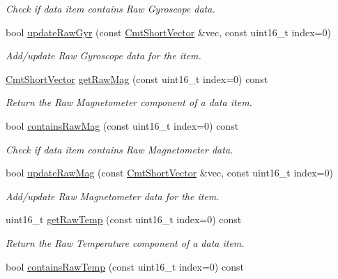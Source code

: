 \begin{DoxyCompactItemize}
\begin{DoxyCompactList}\small\item\em \-Check if data item contains \-Raw \-Gyroscope data. \end{DoxyCompactList}\item 
\hypertarget{classxsens_1_1Packet_a411bdaa5e21af191e53aeac808345b46}{bool \hyperlink{classxsens_1_1Packet_a411bdaa5e21af191e53aeac808345b46}{update\-Raw\-Gyr} (const \hyperlink{structCmtShortVector}{\-Cmt\-Short\-Vector} \&vec, const uint16\-\_\-t index=0)}\label{classxsens_1_1Packet_a411bdaa5e21af191e53aeac808345b46}

\begin{DoxyCompactList}\small\item\em \-Add/update \-Raw \-Gyroscope data for the item. \end{DoxyCompactList}\item 
\hyperlink{structCmtShortVector}{\-Cmt\-Short\-Vector} \hyperlink{classxsens_1_1Packet_a6295db891c79051412086d5732a4149a}{get\-Raw\-Mag} (const uint16\-\_\-t index=0) const 
\begin{DoxyCompactList}\small\item\em \-Return the \-Raw \-Magnetometer component of a data item. \end{DoxyCompactList}\item 
\hypertarget{classxsens_1_1Packet_a1cad4aefa156f83e4f3834e25c0eb38f}{bool \hyperlink{classxsens_1_1Packet_a1cad4aefa156f83e4f3834e25c0eb38f}{contains\-Raw\-Mag} (const uint16\-\_\-t index=0) const }\label{classxsens_1_1Packet_a1cad4aefa156f83e4f3834e25c0eb38f}

\begin{DoxyCompactList}\small\item\em \-Check if data item contains \-Raw \-Magnetometer data. \end{DoxyCompactList}\item 
\hypertarget{classxsens_1_1Packet_afa1827b30ace10708b497c94c4ccf78b}{bool \hyperlink{classxsens_1_1Packet_afa1827b30ace10708b497c94c4ccf78b}{update\-Raw\-Mag} (const \hyperlink{structCmtShortVector}{\-Cmt\-Short\-Vector} \&vec, const uint16\-\_\-t index=0)}\label{classxsens_1_1Packet_afa1827b30ace10708b497c94c4ccf78b}

\begin{DoxyCompactList}\small\item\em \-Add/update \-Raw \-Magnetometer data for the item. \end{DoxyCompactList}\item 
uint16\-\_\-t \hyperlink{classxsens_1_1Packet_a71a434203fac75a8966106aa16ce2198}{get\-Raw\-Temp} (const uint16\-\_\-t index=0) const 
\begin{DoxyCompactList}\small\item\em \-Return the \-Raw \-Temperature component of a data item. \end{DoxyCompactList}\item 
\hypertarget{classxsens_1_1Packet_ab7de6ccae4f186347b03e0eedd1fe852}{bool \hyperlink{classxsens_1_1Packet_ab7de6ccae4f186347b03e0eedd1fe852}{contains\-Raw\-Temp} (const uint16\-\_\-t index=0) const }\label{classxsens_1_1Packet_ab7de6ccae4f186347b03e0eedd1fe852}


\end{DoxyCompactItemize}
